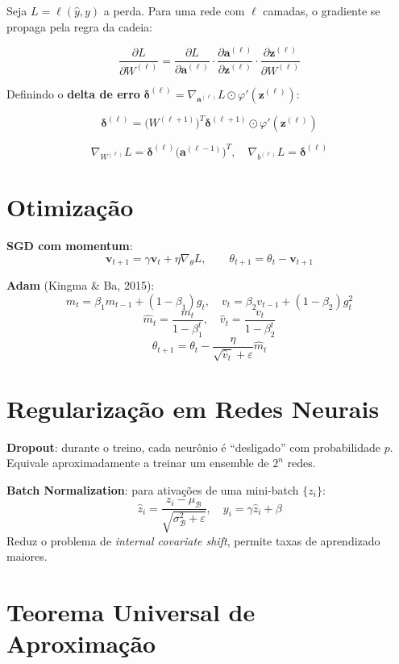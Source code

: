 \documentclass[12pt,a4paper,twoside]{book}
\theoremstyle{definition}
\theoremstyle{remark}
\begin{document}
Seja $L = \ell(\hat{y}, y)$ a perda. Para uma rede com $\ell$ camadas, o gradiente se propaga pela regra da cadeia:

\[
\frac{\partial L}{\partial W^{(\ell)}} = \frac{\partial L}{\partial \bm{a}^{(\ell)}} \cdot \frac{\partial \bm{a}^{(\ell)}}{\partial \bm{z}^{(\ell)}} \cdot \frac{\partial \bm{z}^{(\ell)}}{\partial W^{(\ell)}}
\]

Definindo o \textbf{delta de erro} $\bm{\delta}^{(\ell)} = \nabla_{\bm{a}^{(\ell)}} L \odot \varphi'(\bm{z}^{(\ell)})$:

\[
\bm{\delta}^{(\ell)} = \bigl(W^{(\ell+1)}\bigr)^T \bm{\delta}^{(\ell+1)} \odot \varphi'(\bm{z}^{(\ell)})
\]

\[
\nabla_{W^{(\ell)}} L = \bm{\delta}^{(\ell)} \bigl(\bm{a}^{(\ell-1)}\bigr)^T, \quad \nabla_{b^{(\ell)}} L = \bm{\delta}^{(\ell)}
\]

\section{Otimização}

\textbf{SGD com momentum}:
\[
\bm{v}_{t+1} = \gamma \bm{v}_t + \eta \nabla_\theta L, \qquad \theta_{t+1} = \theta_t - \bm{v}_{t+1}
\]

\textbf{Adam} (Kingma \& Ba, 2015):
\[
m_t = \beta_1 m_{t-1} + (1-\beta_1) g_t, \quad v_t = \beta_2 v_{t-1} + (1-\beta_2) g_t^2
\]
\[
\hat{m}_t = \frac{m_t}{1-\beta_1^t}, \quad \hat{v}_t = \frac{v_t}{1-\beta_2^t}
\]
\[
\theta_{t+1} = \theta_t - \frac{\eta}{\sqrt{\hat{v}_t} + \varepsilon}\hat{m}_t
\]

\section{Regularização em Redes Neurais}

\textbf{Dropout}: durante o treino, cada neurônio é ``desligado'' com probabilidade $p$. Equivale aproximadamente a treinar um ensemble de $2^n$ redes.

\textbf{Batch Normalization}: para ativações de uma mini-batch $\{z_i\}$:
\[
\hat{z}_i = \frac{z_i - \mu_\mathcal{B}}{\sqrt{\sigma^2_\mathcal{B} + \varepsilon}}, \quad y_i = \gamma \hat{z}_i + \beta
\]
Reduz o problema de \textit{internal covariate shift}, permite taxas de aprendizado maiores.

\section{Teorema Universal de Aproximação}
\end{document}

